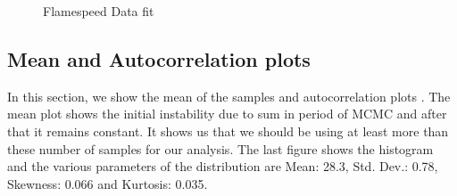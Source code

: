  \begin{figure}[H]
  \ContinuedFloat
  \caption{Flamespeed Data fit}
\end{figure}




\subsection{Mean and Autocorrelation plots}

 In this section, we show the mean of the samples and autocorrelation plots . The mean plot shows the initial instability due to sum in period of MCMC and after that it remains constant. It shows us that we should be using at least more than these number of samples for our analysis. The last figure shows the histogram and the various parameters of the distribution are Mean:  28.3, Std. Dev.:  0.78, Skewness:  0.066 and Kurtosis:  0.035.


